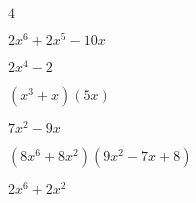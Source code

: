 \documentclass{article}
\begin{document}
\begin{multicols}{2}
 $4$\item $2x^{6}+2x^{5}-10x$\item $2x^{4}-2$\item $(x^{3}+x)(5x)$\item $7x^2-9x$\item $(8x^{6}+8x^2)(9x^2-7x+8)$\item $2x^{6}+2x^2$\it
\end{multicols}
\end{document}

